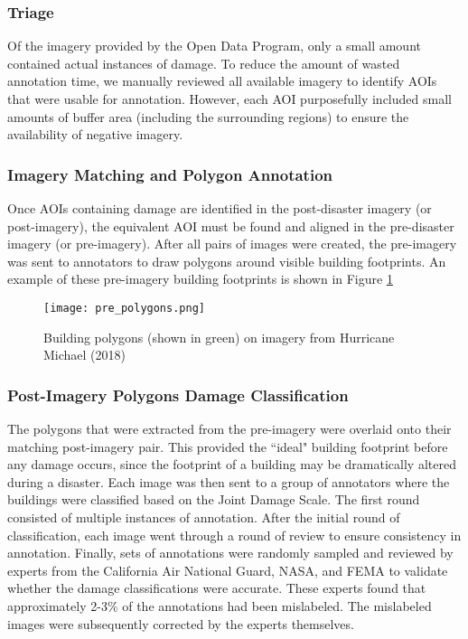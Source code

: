 \documentclass[10pt,twocolumn,letterpaper]{article}
\begin{document}
\vspace{-0.2cm}
\subsubsection{Triage}
Of the imagery provided by the Open Data Program, only a small amount contained actual instances of damage.
To reduce the amount of wasted annotation time, we manually reviewed all available imagery to identify AOIs that were usable for annotation.
However, each AOI purposefully included small amounts of buffer area (including the surrounding regions) to ensure the availability of negative imagery.

\vspace{-0.2cm}
\subsubsection{Imagery Matching and Polygon Annotation}
Once AOIs containing damage are identified in the post-disaster imagery (or post-imagery), the equivalent AOI must be found and aligned in the pre-disaster imagery (or pre-imagery).
After all pairs of images were created, the pre-imagery was sent to annotators to draw polygons around visible building footprints. An example of these pre-imagery building footprints is shown in Figure \ref{fig:pre.polygons}

\begin{figure}[!h]
	\begin{center}
		\texttt{[image: pre\_polygons.png]}
	\end{center}
	\caption{Building polygons (shown in green) on imagery from Hurricane Michael (2018)}
	\label{fig:pre.polygons}
\end{figure}

\vspace{-0.2cm}
\subsubsection{Post-Imagery Polygons Damage Classification}
The polygons that were extracted from the pre-imagery were overlaid onto their matching post-imagery pair.
This provided the ``ideal" building footprint before any damage occurs, since the footprint of a building may be dramatically altered during a disaster.
Each image was then sent to a group of annotators where the buildings were classified based on the Joint Damage Scale.
The first round consisted of multiple instances of annotation.
After the initial round of classification, each image went through a round of review to ensure consistency in annotation.
Finally, sets of annotations were randomly sampled and reviewed by experts from the California Air National Guard, NASA, and FEMA to  validate whether the damage classifications were accurate.
These experts found that approximately 2-3\% of the annotations had been mislabeled.
The mislabeled images were subsequently corrected by the experts themselves.
\end{document}
